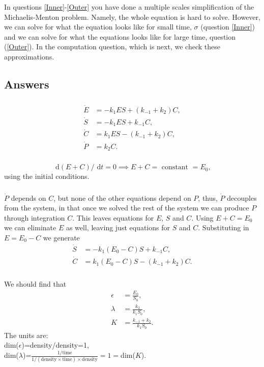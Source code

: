 \documentclass[]{article}
\newcommand{\bb}{\begin{equation}}
\newcommand{\ee}{\end{equation}}
\newcommand{\rd}{\text{ d}}
\renewcommand{\l}{\left(}
\renewcommand{\r}{\right)}
\begin{document}
In questions \ref{Inner}-\ref{Outer} you have done a multiple scales simplification of the Michaelis-Menton problem. Namely, the whole equation is hard to solve. However, we can solve for what the equation looks like for small time, $\sigma$ (question \ref{Inner}) and we can solve for what the equations looks like for large time, question (\ref{Outer}). In the computation question, which is next, we check these approximations.

\begin{Answ}
\subsection{Answers}
\subsubsection{}
\begin{align}
\dot{E}&=-k_1ES+\l k_{-1}+k_2\r C,\nonumber\\
\dot{S}&=-k_1ES+k_{-1} C,\nonumber\\
\dot{C}&=k_1ES-\l k_{-1}+k_2\r C,\nonumber\\
\dot{P}&=k_2C\nonumber.
\end{align}
\subsubsection{}
\bb
\rd\l E+C\r/\rd t=0\implies E+C=\textrm{ constant }=E_0,
\ee
using the initial conditions.
\subsubsection{}
$\dot{P}$ depends on $C$, but none of the other equations depend on $P$, thus, $\dot{P}$ decouples from the system, in that once we solved the rest of the system we can produce $P$ through integration $C$. This leaves equations for $E$, $S$ and $C$. Using $E+C=E_0$ we can eliminate $E$ as well, leaving just equations for $S$ and $C$. Substituting in $E=E_0-C$ we generate
\begin{align}
\dot{S}&=-k_1(E_0-C)S + k_{-1}C,\\
\dot{C}&=k_1(E_0-C)S -( k_{-1}+k_2)C.
\end{align}
\subsubsection{}
We should find that
\begin{align}
\epsilon&=\frac{E_0}{S_0},\nonumber\\
\lambda&=\frac{k_2}{k_1S_0},\nonumber\\
K&=\frac{k_{-1}+k_2}{k_1S_0}\nonumber.
\end{align}
The units are:\\
dim($\epsilon$)=density/density=1,\\
dim($\lambda$)=$\frac{\textrm{1/time}}{1/(\textrm{density}\times \textrm{time}) \times \textrm{density}}=1=$dim($K$).

\end{Answ}
\end{document}
